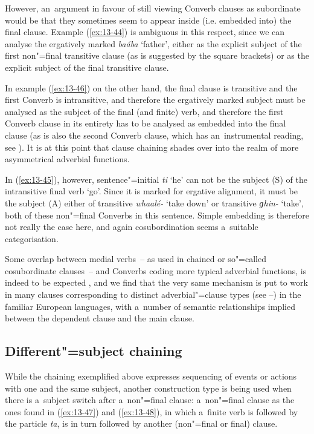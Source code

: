 However, an~argument in favour of still viewing Converb clauses as subordinate would be that they sometimes seem to appear inside (i.e. embedded into) the final clause. Example (\ref{ex:13-44}) is ambiguous in this respect, since we can analyse the ergatively marked \textit{baába} `father', either as the explicit subject of the first non"=final transitive clause (as is suggested by the square brackets) or as the explicit subject of the final transitive clause. 



In example (\ref{ex:13-46}) on the other hand, the final clause is transitive and the first Converb is intransitive, and therefore the ergatively marked subject must be analysed as the subject of the final (and finite) verb, and therefore the first Converb clause in its entirety has to be analysed as embedded into the final clause (as is also the second Converb clause, which has an~instrumental reading, see ). It is at this point that clause chaining shades over into the realm of more asymmetrical adverbial functions. 



In (\ref{ex:13-45}), however, sentence"=initial \textit{ti} `he' can not be the subject (S) of the intransitive final verb `go'. Since it is marked for ergative alignment, it must be the subject (A) either of transitive \textit{whaalé-} `take down' or transitive \textit{ɡhin-} `take', both of these non"=final Converbs in this sentence. Simple embedding is therefore not really the case here, and again cosubordination seems a~suitable categorisation. 



Some overlap between medial verbs~-- as used in chained or so"=called cosubordinate clauses~-- and Converbs coding more typical adverbial functions, is indeed to be expected \citep[26]{haspelmath1995}, and we find that the very same mechanism is put to work in many clauses corresponding to distinct adverbial"=clause types (see --) in the familiar European languages, with a~number of semantic relationships implied between the dependent clause and the main clause. 


\subsection{Different"=subject chaining}
\label{subsec:13-3-2}


While the chaining exemplified above expresses sequencing of events or actions with one and the same subject, another construction type is being used when there is a~subject switch after a~non"=final clause: a~non"=final clause as the ones found in (\ref{ex:13-47}) and (\ref{ex:13-48}), in which a~finite verb is followed by the particle \textit{ta}, is in turn followed by another (non"=final or final) clause.

